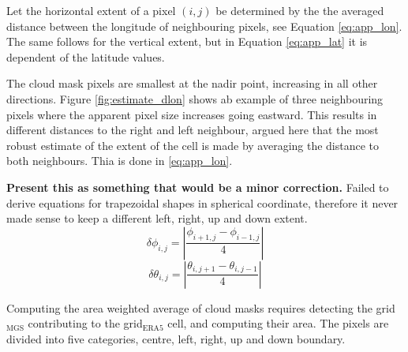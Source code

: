 Let the horizontal extent of a pixel $(i,j)$ be determined by the the averaged distance between the longitude of neighbouring pixels, see Equation \eqref{eq:app_lon}. The same follows for the vertical extent, but in Equation \eqref{eq:app_lat} it is dependent of the latitude values. 

The cloud mask pixels are smallest at the nadir point, increasing in all other directions. Figure \ref{fig:estimate_dlon} shows ab example of three neighbouring pixels where the apparent pixel size increases going eastward. This results in different distances to the right and left neighbour, argued here that the most robust estimate of the extent of the cell is made by averaging the distance to both neighbours. Thia is done in \eqref{eq:app_lon}. 

\textbf{Present this as something that would be a minor correction.}
Failed to derive equations for trapezoidal shapes in spherical coordinate, therefore it never made sense to keep a different left, right, up and down extent. 
\begin{equation} \label{eq:app_lon}
    \delta \phi_{i,j} = \left| \frac{\phi_{i+1,j} - \phi_{i-1, j}}{4} \right|
\end{equation}
\begin{equation} \label{eq:app_lat}
    \delta \theta_{i,j} = \left| \frac{\theta_{i,j+1} - \theta_{i, j-1}}{4} \right|
\end{equation}

Computing the area weighted average of cloud masks requires detecting the grid$_{\text{MGS}}$ contributing to the grid$_{\text{ERA5}}$ cell, and computing their area. The pixels are divided into five categories, centre, left, right, up and down boundary. 

